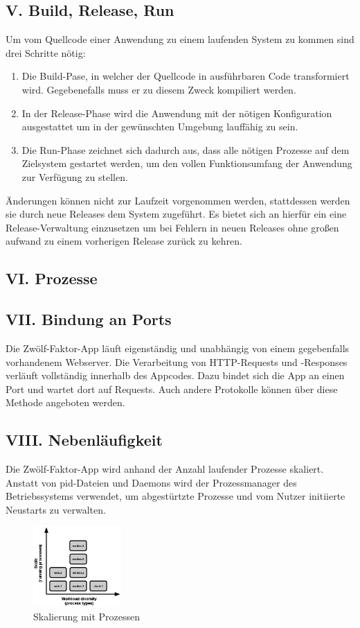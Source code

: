 \documentclass[fleqn,10pt]{SelfArx} %
\begin{document}
\subsection{V. Build, Release, Run}
Um vom Quellcode einer Anwendung zu einem laufenden System zu kommen sind drei Schritte nötig:
\begin{enumerate}
	\item Die Build-Pase, in welcher der Quellcode in ausführbaren Code transformiert wird. Gegebenefalls muss er zu diesem Zweck kompiliert werden.
	\item In der Release-Phase wird die Anwendung mit der nötigen Konfiguration ausgestattet um in der gewünschten Umgebung lauffähig zu sein.
	\item Die Run-Phase zeichnet sich dadurch aus, dass alle nötigen Prozesse auf dem Zielsystem gestartet werden, um den vollen Funktionsumfang der Anwendung zur Verfügung zu stellen.
\end{enumerate}
Änderungen können nicht zur Laufzeit vorgenommen werden, stattdessen werden sie durch neue Releases dem System zugeführt. Es bietet sich an hierfür ein eine Release-Verwaltung einzusetzen um bei Fehlern in neuen Releases ohne großen aufwand zu einem vorherigen Release zurück zu kehren.
\subsection{VI. Prozesse}

\subsection{VII. Bindung an Ports}
Die Zwölf-Faktor-App läuft eigenständig und unabhängig von einem gegebenfalls vorhandenem Webserver. Die Verarbeitung von HTTP-Requests und -Responses verläuft vollständig innerhalb des Appcodes. Dazu bindet sich die App an einen Port und wartet dort auf Requests. Auch andere Protokolle können über diese Methode angeboten werden.
\subsection{VIII. Nebenläufigkeit}
Die Zwölf-Faktor-App wird anhand der Anzahl laufender Prozesse skaliert. Anstatt von pid-Dateien und Daemons wird der Prozessmanager des Betriebssystems verwendet, um abgestürtzte Prozesse und vom Nutzer initiierte Neustarts zu verwalten.
\begin{figure}[htpb]
	\centering
	\includegraphics[width=0.3\textwidth]{../process-types.png}
	\caption{Skalierung mit Prozessen~\cite{factor-concurrency}}
\end{figure}
\end{document}
